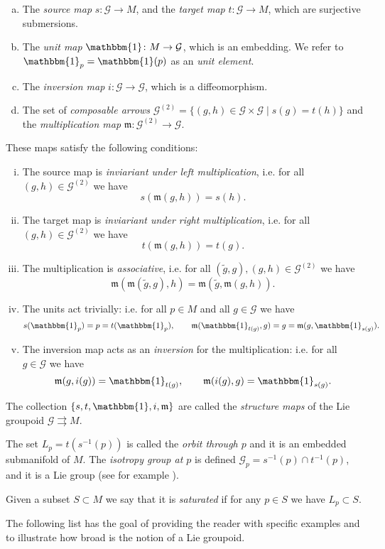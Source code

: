 \documentclass[12pt,a4paper,reqno]{amsart}
\newcommand{\1}{\mathbbm{1}} %
\newcommand{\G}{\mathcal{G}} %
\newcommand{\m}{\mathfrak{m}} %
\theoremstyle{definition}
\theoremstyle{TheoremNum}
\begin{document}
\begin{enumerate}[a)]
 \setlength\itemsep{0.3em}
\item The \emph{source map} $s\colon \G\to M$, and the \emph{target map} $t\colon \G\to M$, which are surjective submersions.
\item The \emph{unit map} $\1\colon M\to \G$, which is an embedding. We refer to $\1_p = \1(p)$ as an \emph{unit element}.
\item The \emph{inversion map} $i\colon \G\to \G$, which is a diffeomorphism.
\item The set of \emph{composable arrows} $\G^{(2)} = \{(g,h)\in \G\times \G\mid s(g) = t(h)\}$ and the \emph{multiplication map} $\m\colon \G^{(2)}\to \G$.
\end{enumerate}
These maps satisfy the following conditions:
\begin{enumerate}[i)]
\item The source map is \emph{inviariant under left multiplication}, i.e. for all $(g,h)\in \G^{(2)}$ we have
\[
	s(\m(g,h)) = s(h).
\]
\item The target map is \emph{inviariant under right multiplication}, i.e. for all $(g,h)\in \G^{(2)}$ we have
\[
	t(\m(g,h)) = t(g).
\]
\item The multiplication is \emph{associative}, i.e. for all $(\tilde{g},g),(g,h)\in \G^{(2)}$ we have
\[
	\m(\m(\tilde{g},g),h) = \m(\tilde{g},\m(g,h)).
\]
\item The units act trivially: i.e. for all $p\in M$ and all $g\in \G$ we have
\[
	s(\1_p) = p = t(\1_p), \qquad \m(\1_{t(g)},g) = g = \m(g,\1_{s(g)}).
\]
\item The inversion map acts as an \emph{inversion} for the multiplication: i.e. for all $g\in \G$ we have
\[
	\m(g,i(g)) = \1_{t(g)},\qquad \m(i(g),g) = \1_{s(g)}.
\]
\end{enumerate}
The collection $\{s,t,\1,i,\m\}$ are called the \emph{structure maps} of the Lie groupoid $\G\rightrightarrows M$. 

The set $L_p = t(s^{-1}(p))$ is called the \emph{orbit through $p$} and it is an embedded submanifold of $M$. The \emph{isotropy group at $p$} is defined $\G_p = s^{-1}(p)\cap t^{-1}(p)$, and it is a Lie group (see for example \cite[Proposition~1.1.3]{Wang2018}).

Given a subset $S\subset M$ we say that it is \emph{saturated} if for any $p\in S$ we have $L_p\subset S$.

The following list has the goal of providing the reader with specific examples and to illustrate how broad is the notion of a Lie groupoid.
\end{document}
